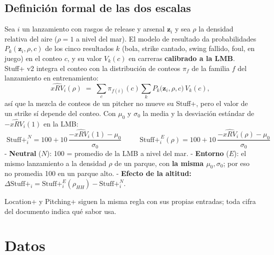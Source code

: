 \documentclass[
  english,
  spanish,
  10pt,
  letterpaper,
]{article}
\begin{document}
\subsection{Definición formal de las dos
escalas}\label{definiciuxf3n-formal-de-las-dos-escalas}

Sea \(i\) un lanzamiento con rasgos de release y arsenal
\(\mathbf{z}_i\) y sea \(\rho\) la densidad relativa del aire
(\(\rho=1\) a nivel del mar). El modelo de resultado da probabilidades
\(P_k(\mathbf{z}_i,\rho,c)\) de los cinco resultados \(k\) (bola, strike
cantado, swing fallido, foul, en juego) en el conteo \(c\), y su valor
\(V_k(c)\) en carreras \textbf{calibrado a la LMB}. Stuff+ v2 integra el
conteo con la distribución de conteos \(\pi_f\) de la familia \(f\) del
lanzamiento en entrenamiento:
\[\widehat{xRV}_i(\rho) \;=\; \sum_{c}\pi_{f(i)}(c)\sum_{k} P_k\!\big(\mathbf{z}_i,\rho,c\big)\,V_k(c),\]
así que la mezcla de conteos de un pitcher no mueve su Stuff+, pero el
valor de un strike sí depende del conteo. Con \(\mu_0\) y \(\sigma_0\)
la media y la desviación estándar de \(-\widehat{xRV}_i(1)\) en la LMB:
\[\boxed{\;\text{Stuff+}^{\,N}_i = 100 + 10\,\frac{-\widehat{xRV}_i(1)-\mu_0}{\sigma_0}\;}
\qquad
\boxed{\;\text{Stuff+}^{\,E}_i(\rho) = 100 + 10\,\frac{-\widehat{xRV}_i(\rho)-\mu_0}{\sigma_0}\;}\]
- \textbf{Neutral} (\(N\)): 100 = promedio de la LMB a nivel del mar. -
\textbf{Entorno} (\(E\)): el mismo lanzamiento a la densidad \(\rho\) de
un parque, con \textbf{la misma \(\mu_0,\sigma_0\)}; por eso no promedia
100 en un parque alto. - \textbf{Efecto de la altitud:}
\(\Delta\text{Stuff+}_i=\text{Stuff+}^{E}_i(\rho_{HH})-\text{Stuff+}^{N}_i\).

Location+ y Pitching+ siguen la misma regla con sus propias entradas;
toda cifra del documento indica qué sabor usa.

\section{Datos}\label{datos}
\end{document}
